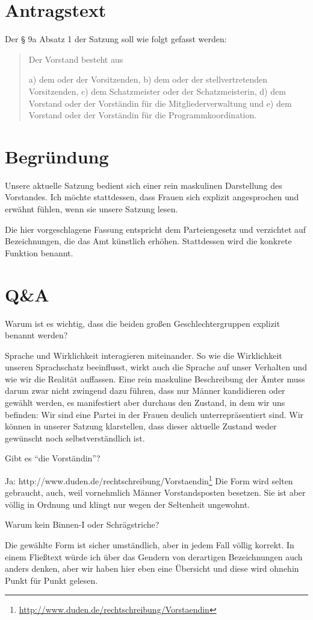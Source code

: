 \section{Antragstext}

Der § 9a Absatz 1 der Satzung soll wie folgt gefasst werden:

\begin{quote}
Der Vorstand besteht aus

a) dem oder der Vorsitzenden,
b) dem oder der stellvertretenden Vorsitzenden,
c) dem Schatzmeister oder der Schatzmeisterin,
d) dem Vorstand oder der Vorständin für die Mitgliederverwaltung und
e) dem Vorstand oder der Vorständin für die Programmkoordination.

\end{quote}
\section{Begründung}

Unsere aktuelle Satzung bedient sich einer rein maskulinen Darstellung des Vorstandes. Ich möchte stattdessen, dass Frauen sich explizit angesprochen und erwähnt fühlen, wenn sie unsere Satzung lesen.

Die hier vorgeschlagene Fassung entspricht dem Parteiengesetz und verzichtet auf Bezeichnungen, die das Amt künstlich erhöhen. Stattdessen wird die konkrete Funktion benannt.

\section{Q\&A}

Warum ist es wichtig, dass die beiden großen Geschlechtergruppen explizit benannt werden?

Sprache und Wirklichkeit interagieren miteinander. So wie die Wirklichkeit unseren Sprachschatz beeinflusst, wirkt auch die Sprache auf unser Verhalten und wie wir die Realität auffassen. Eine rein maskuline Beschreibung der Ämter muss darum zwar nicht zwingend dazu führen, dass nur Männer kandidieren oder gewählt werden, es manifestiert aber durchaus den Zustand, in dem wir uns befinden: Wir sind eine Partei in der Frauen deulich unterrepräsentiert sind. Wir können in unserer Satzung klarstellen, dass dieser aktuelle Zustand weder gewünscht noch selbstverständlich ist.

Gibt es ``die Vorständin''?

Ja: http://www.duden.de/rechtschreibung/Vorstaendin\footnote{\url{http://www.duden.de/rechtschreibung/Vorstaendin}} Die Form wird selten gebraucht, auch, weil vornehmlich Männer Vorstandsposten besetzen. Sie ist aber völlig in Ordnung und klingt nur wegen der Seltenheit ungewohnt.

Warum kein Binnen-I oder Schrägstriche?

Die gewählte Form ist sicher umständlich, aber in jedem Fall völlig korrekt. In einem Fließtext würde ich über das Gendern von derartigen Bezeichnungen auch anders denken, aber wir haben hier eben eine Übersicht und diese wird ohnehin Punkt für Punkt gelesen.
